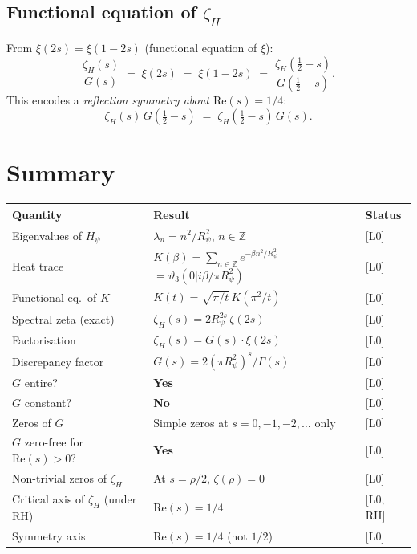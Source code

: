 \documentclass[11pt,a4paper]{article}
\theoremstyle{definition}
\theoremstyle{remark}
\newcommand{\Rp}{R_{\psi}}
\newcommand{\Gam}{\Gamma}
\newcommand{\Hp}{H_{\psi}}
\begin{document}
\subsection{Functional equation of $\zeta_H$}

From $\xi(2s) = \xi(1-2s)$ (functional equation of $\xi$):
\begin{equation}\label{eq:func-eq}
  \frac{\zeta_H(s)}{G(s)}
  \;=\; \xi(2s) \;=\; \xi(1-2s)
  \;=\; \frac{\zeta_H(\tfrac{1}{2}-s)}{G(\tfrac{1}{2}-s)}.
\end{equation}
This encodes a \emph{reflection symmetry about $\mathrm{Re}(s) = 1/4$}:
\begin{equation}\label{eq:reflect}
  \zeta_H(s)\,G\!\left(\tfrac{1}{2}-s\right)
  \;=\; \zeta_H\!\left(\tfrac{1}{2}-s\right)\,G(s).
\end{equation}

\section{Summary}
\label{sec:summary}

\begin{tcolorbox}[colback=green!4!white, colframe=green!50!black, title=Main results]
\begin{center}
\renewcommand{\arraystretch}{1.4}
\begin{tabular}{lll}
\toprule
Quantity & Result & Status \\
\midrule
Eigenvalues of $\Hp$ & $\lambda_n = n^2/\Rp^2$, $n\in\mathbb{Z}$ & [L0] \\
Heat trace & $K(\beta) = \sum_{n\in\mathbb{Z}} e^{-\beta n^2/\Rp^2}$
           $= \vartheta_3(0|i\beta/\pi\Rp^2)$ & [L0] \\
Functional eq.\ of $K$ & $K(t) = \sqrt{\pi/t}\,K(\pi^2/t)$ & [L0] \\
Spectral zeta (exact) & $\zeta_H(s) = 2\Rp^{2s}\,\zeta(2s)$ & [L0] \\
Factorisation & $\zeta_H(s) = G(s)\cdot\xi(2s)$ & [L0] \\
Discrepancy factor & $G(s) = 2(\pi\Rp^2)^s/\Gam(s)$ & [L0] \\
$G$ entire? & \textbf{Yes} & [L0] \\
$G$ constant? & \textbf{No} & [L0] \\
Zeros of $G$ & Simple zeros at $s=0,-1,-2,\ldots$ only & [L0] \\
$G$ zero-free for $\mathrm{Re}(s)>0$? & \textbf{Yes} & [L0] \\
Non-trivial zeros of $\zeta_H$ & At $s=\rho/2$, $\zeta(\rho)=0$ & [L0] \\
Critical axis of $\zeta_H$ (under RH) & $\mathrm{Re}(s) = 1/4$ & [L0,\,RH] \\
Symmetry axis & $\mathrm{Re}(s) = 1/4$ (not $1/2$) & [L0] \\
\bottomrule
\end{tabular}
\end{center}
\end{tcolorbox}
\end{document}
